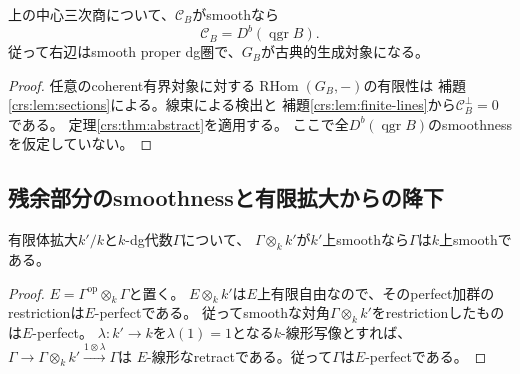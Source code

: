 \begin{theorem}[線束部分のsmoothnessで全coherent圏を得る]
\label{crs:thm:coherent}
上の中心三次商について、$\mathcal C_B$がsmoothなら
\[
 \boxed{\quad
 \mathcal C_B=D^b(\operatorname{qgr}B).
 \quad}\tag{CS3}\label{crs:eq:full}
\]
従って右辺はsmooth proper dg圏で、$G_B$が古典的生成対象になる。
\end{theorem}
\begin{proof}
任意のcoherent有界対象に対する$\operatorname{RHom}(G_B,-)$の有限性は
補題\ref{crs:lem:sections}による。線束による検出と
補題\ref{crs:lem:finite-lines}から$\mathcal C_B^\perp=0$である。
定理\ref{crs:thm:abstract}を適用する。
ここで全$D^b(\operatorname{qgr}B)$のsmoothnessを仮定していない。
\end{proof}

\subsection{残余部分のsmoothnessと有限拡大からの降下}

\begin{lemma}[有限体拡張からのsmoothness降下]
\label{crs:lem:descent}
有限体拡大$k'/k$と$k$-dg代数$\Gamma$について、
$\Gamma\otimes_k k'$が$k'$上smoothなら$\Gamma$は$k$上smoothである。
\end{lemma}
\begin{proof}
$E=\Gamma^{\mathrm{op}}\otimes_k\Gamma$と置く。
$E\otimes_k k'$は$E$上有限自由なので、そのperfect加群のrestrictionは$E$-perfectである。
従ってsmoothな対角$\Gamma\otimes_k k'$をrestrictionしたものは$E$-perfect。
$\lambda:k'\to k$を$\lambda(1)=1$となる$k$-線形写像とすれば、
$\Gamma\to\Gamma\otimes_k k'\xrightarrow{1\otimes\lambda}\Gamma$は
$E$-線形なretractである。従って$\Gamma$は$E$-perfectである。
\end{proof}

